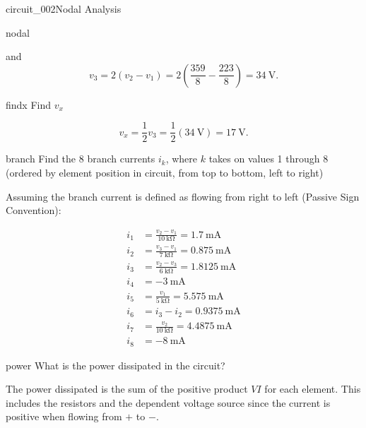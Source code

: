 \begin{mainquestion}{circuit_002}{Nodal Analysis}
\begin{partquestion}{nodal}
\begin{answer}
and
\[
v_3
=
2(v_2 - v_1)
=
2\left(\frac{359}{8} - \frac{223}{8}\right)
=
\qty{34}{\volt}.
\]
\end{answer}
\end{partquestion}

\begin{partquestion}{findx}
{Find $v_x$}

\begin{answer}
\[
v_x = \frac{1}{2}v_3
= \frac{1}{2}\left(\qty{34}{\volt}\right)
= \qty{17}{\volt}.
\]
\end{answer}
\end{partquestion}

\begin{partquestion}{branch}
{Find the 8 branch currents $i_k$, where $k$ takes on values 1 through 8 (ordered by element position in circuit, from top to bottom, left to right)}

\begin{answer}
Assuming the branch current is defined as flowing from right to left (Passive Sign Convention):

\begin{align}
i_1 &= \frac{v_2 - v_1}{\qty{10}{\kilo\ohm}} = \qty{1.7}{\milli\ampere} \\
i_2 &= \frac{v_3 - v_1}{\qty{7}{\kilo\ohm}} = \qty{0.875}{\milli\ampere} \\
i_3 &= \frac{v_2 - v_3}{\qty{6}{\kilo\ohm}} = \qty{1.8125}{\milli\ampere} \\
i_4 &= \qty{-3}{\milli\ampere} \\
i_5 &= \frac{v_1}{\qty{5}{\kilo\ohm}} = \qty{5.575}{\milli\ampere} \\
i_6 &= i_3 - i_2 = \qty{0.9375}{\milli\ampere} \\
i_7 &= \frac{v_2}{\qty{10}{\kilo\ohm}} = \qty{4.4875}{\milli\ampere} \\
i_8 &= \qty{-8}{\milli\ampere}
\end{align}
\end{answer}
\end{partquestion}

\begin{partquestion}{power}
{What is the power dissipated in the circuit?}

\begin{answer}
The power dissipated is the sum of the positive product $VI$ for each element. This includes the resistors and the dependent voltage source since the current is positive when flowing from $+$ to $-$.


\end{answer}
\end{partquestion}
\end{mainquestion}
